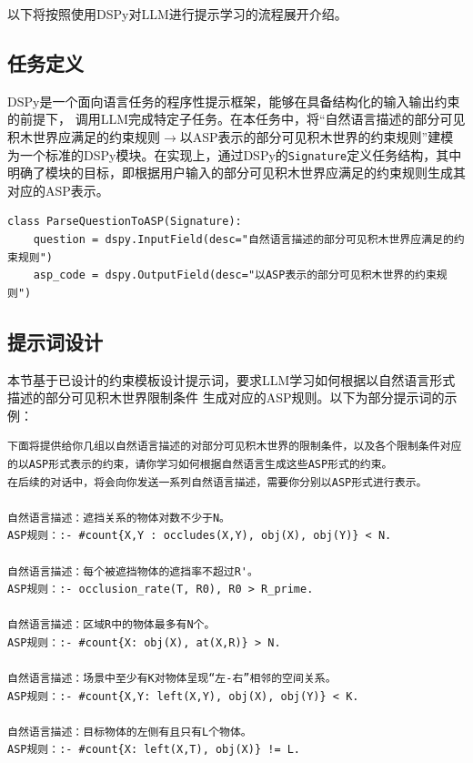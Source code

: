 以下将按照使用DSPy对LLM进行提示学习的流程展开介绍。
\subsection{任务定义}
DSPy是一个面向语言任务的程序性提示框架，能够在具备结构化的输入输出约束的前提下，
调用LLM完成特定子任务。在本任务中，将“自然语言描述的部分可见积木世界应满足的约束规则$\rightarrow$以ASP表示的部分可见积木世界的约束规则”建模为一个标准的DSPy模块。在实现上，通过DSPy的\texttt{Signature}定义任务结构，其中明确了模块的目标，即根据用户输入的部分可见积木世界应满足的约束规则生成其对应的ASP表示。
\begin{lstlisting}
class ParseQuestionToASP(Signature):
    question = dspy.InputField(desc="自然语言描述的部分可见积木世界应满足的约束规则")
    asp_code = dspy.OutputField(desc="以ASP表示的部分可见积木世界的约束规则")
\end{lstlisting}
\subsection{提示词设计}
本节基于已设计的约束模板设计提示词，要求LLM学习如何根据以自然语言形式描述的部分可见积木世界限制条件
生成对应的ASP规则。以下为部分提示词的示例：
\begin{lstlisting}
下面将提供给你几组以自然语言描述的对部分可见积木世界的限制条件，以及各个限制条件对应的以ASP形式表示的约束，请你学习如何根据自然语言生成这些ASP形式的约束。
在后续的对话中，将会向你发送一系列自然语言描述，需要你分别以ASP形式进行表示。

自然语言描述：遮挡关系的物体对数不少于N。
ASP规则：:- #count{X,Y : occludes(X,Y), obj(X), obj(Y)} < N.

自然语言描述：每个被遮挡物体的遮挡率不超过R'。
ASP规则：:- occlusion_rate(T, R0), R0 > R_prime.

自然语言描述：区域R中的物体最多有N个。
ASP规则：:- #count{X: obj(X), at(X,R)} > N.

自然语言描述：场景中至少有K对物体呈现“左-右”相邻的空间关系。
ASP规则：:- #count{X,Y: left(X,Y), obj(X), obj(Y)} < K.

自然语言描述：目标物体的左侧有且只有L个物体。
ASP规则：:- #count{X: left(X,T), obj(X)} != L.
\end{lstlisting}
